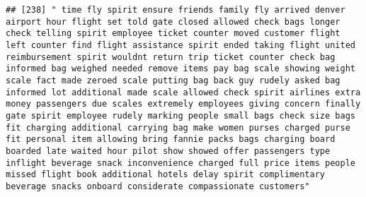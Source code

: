 \documentclass[
]{article}
\begin{document}
\begin{verbatim}
## [238] " time fly spirit ensure friends family fly arrived denver airport hour flight set told gate closed allowed check bags longer check telling spirit employee ticket counter moved customer flight left counter find flight assistance spirit ended taking flight united reimbursement spirit wouldnt return trip ticket counter check bag informed bag weighed needed remove items pay bag scale showing weight scale fact made zeroed scale putting bag back guy rudely asked bag informed lot additional made scale allowed check spirit airlines extra money passengers due scales extremely employees giving concern finally gate spirit employee rudely marking people small bags check size bags fit charging additional carrying bag make women purses charged purse fit personal item allowing bring fannie packs bags charging board boarded late waited hour pilot show showed offer passengers type inflight beverage snack inconvenience charged full price items people missed flight book additional hotels delay spirit complimentary beverage snacks onboard considerate compassionate customers"                                                                                                                                                                                                                                                                                                                                                                                                                                                                                                                                                                                                                                                                                

\end{verbatim}
\end{document}

